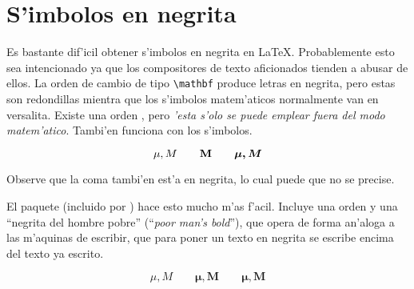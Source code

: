 \section{S'imbolos en negrita}

Es bastante dif'icil obtener s'imbolos en negrita en \LaTeX\@.
Probablemente esto sea intencionado ya que los compositores de texto
aficionados tienden a abusar de ellos. La orden de cambio de tipo
\verb|\mathbf| produce letras en negrita, pero estas son redondillas
mientra que los s'imbolos matem'aticos normalmente van en versalita.
Existe una orden , pero \emph{'esta s'olo se puede
  emplear fuera del modo matem'atico}. Tambi'en funciona con los
s'imbolos.

\begin{example}
\begin{displaymath}
\mu, M \qquad \mathbf{M} \qquad
\mbox{\boldmath $\mu, M$}
\end{displaymath}
\end{example}

\noindent
Observe que la coma tambi'en est'a en negrita, lo cual puede que no
se precise.

El paquete  (incluido por ) hace
esto mucho m'as f'acil. Incluye una orden  y una
``negrita del hombre pobre''  (``\emph{poor man's bold}''),
que opera de forma an'aloga a las m'aquinas de escribir, que para
poner un texto en negrita se escribe encima del texto ya escrito.

\ifx\boldsymbol\undefined\else
\begin{example}
\begin{displaymath}
\mu, M \qquad
\boldsymbol{\mu}, \boldsymbol{M}
\qquad \pmb{\mu}, \pmb{M}
\end{displaymath}
\end{example}
\fi


\endinput

